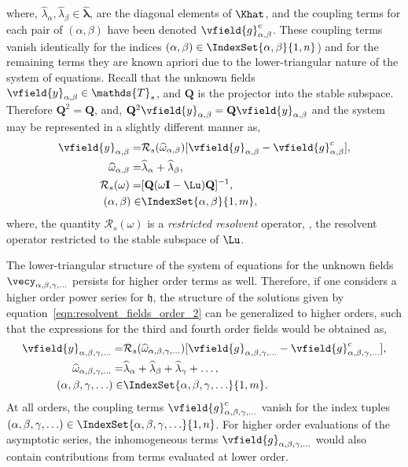 where, $\widehat{\lambda}_{\alpha},\widehat{\lambda}_{\beta} \in \widehat{\boldsymbol{\lambda}}$, are the diagonal elements of $\Khat$, and the coupling terms for each pair of $(\alpha,\beta)$ have been denoted $\vfield{g}^{c}_{\alpha,\beta}$. These coupling terms vanish identically for the indices $(\alpha,\beta)\in\IndexSet{\alpha,\beta}{1,n}$) and for the remaining terms they are known apriori due to the lower-triangular nature of the system of equations. Recall that the unknown fields $\vfield{y}_{\alpha,\beta}\in\mathds{T}_{s}$, and $\mathbf{Q}$ is the projector into the stable subspace. Therefore $\mathbf{Q}^{2} = \mathbf{Q}$, and, $\mathbf{Q}^{2}\vfield{y}_{\alpha,\beta} = \mathbf{Q}\vfield{y}_{\alpha,\beta}$ and the system may be represented in a slightly different manner as, 
	\begin{align}
	\label{eqn:resolvent_fields_order_2}
	\begin{split}
		\vfield{y}_{\alpha,\beta} =&  \mathcal{R}_{s}(\widehat{\omega}_{\alpha,\beta})[\vfield{g}_{\alpha,\beta} - \vfield{g}^{c}_{\alpha,\beta}], \\
		\widehat{\omega}_{\alpha,\beta} =& \widehat{\lambda}_{\alpha} + \widehat{\lambda}_{\beta}, \\
		\mathcal{R}_{s}(\omega) =& [\mathbf{Q}(\omega\mathbf{I} 
		- \Lu)\mathbf{Q}]^{-1}, \\
		(\alpha,\beta) \in& \IndexSet{\alpha,\beta}{1,m},
	\end{split}
\end{align}
where, the quantity $\mathcal{R}_{s}(\omega)$ is a \emph{restricted resolvent} operator, \ie, the resolvent operator restricted to the stable subspace of $\Lu$. 

The lower-triangular structure of the system of equations for the unknown fields $\vecy_{\alpha,\beta,\gamma,\ldots}$ persists for higher order terms as well. Therefore, if one considers a higher order power series for $\mathfrak{h}$, the structure of the solutions given by equation~\eqref{eqn:resolvent_fields_order_2} can be generalized to higher orders, such that the expressions for the third and fourth order fields would be obtained as,
\begin{align}
	\label{eqn:resolvent_fields_higher_order}
	\begin{split}
		\vfield{y}_{\alpha,\beta,\gamma,\ldots} =&  	\mathcal{R}_{s}(\widehat{\omega}_{\alpha,\beta,\gamma,\ldots})[\vfield{g}_{\alpha,\beta,\gamma,\ldots} - \vfield{g}^{c}_{\alpha,\beta,\gamma,\ldots}], \\
		\widehat{\omega}_{\alpha,\beta,\gamma,\ldots} =& \widehat{\lambda}_{\alpha} + 	\widehat{\lambda}_{\beta} + \widehat{\lambda}_{\gamma} + \ldots, \\
		(\alpha,\beta,\gamma,\ldots) \in& \IndexSet{\alpha,\beta,\gamma,\ldots}{1,m}.
	\end{split} 
\end{align}
At all orders, the coupling terms $\vfield{g}^{c}_{\alpha,\beta,\gamma,\ldots}$ vanish for the index tuples $(\alpha,\beta,\gamma,\ldots)\in\IndexSet{\alpha,\beta,\gamma,\ldots}{1,n}$. For higher order evaluations of the asymptotic series, the inhomogeneous terms $\vfield{g}_{\alpha,\beta,\gamma,\ldots}$ would also contain contributions from terms evaluated at lower order. 

